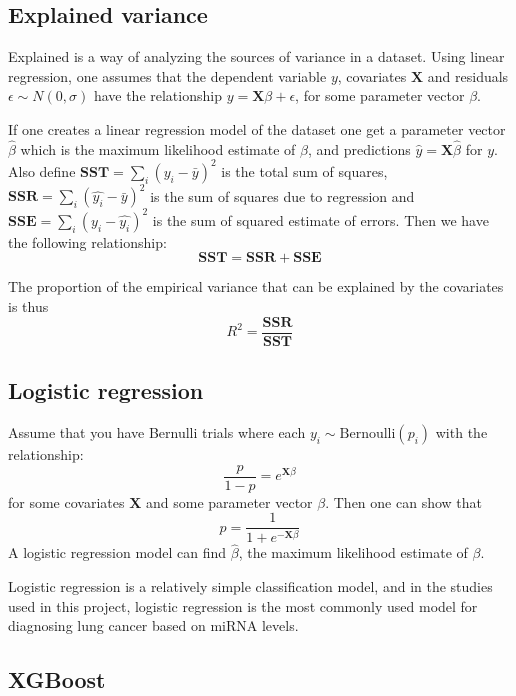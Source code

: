 \subsection{Explained variance}
\label{subsec:explained_variance}

Explained is a way of analyzing the sources of variance in a dataset. Using linear regression, one assumes that the dependent variable $y$, covariates $\mathbf{X}$ and residuals $\epsilon \sim N(0, \sigma)$ have the relationship $y = \mathbf{X}\beta + \epsilon$, for some parameter vector $\beta$.


If one creates a linear regression model of the dataset one get a parameter vector $\hat{\beta}$ which is the maximum likelihood estimate of $\beta$, and predictions $\hat{y} = \mathbf{X} \hat{\beta}$ for $y$. Also define $\mathbf{SST} = \sum_i \left(y_i - \bar{y}\right)^2$ is the total sum of squares, $\mathbf{SSR} = \sum_i \left(\hat{y_i} - \bar{y}\right)^2$ is the sum of squares due to regression and $\mathbf{SSE} = \sum_i \left(y_i - \hat{y_i}\right)^2$ is the sum of squared estimate of errors. Then we have the following relationship:
$$\mathbf{SST} = \mathbf{SSR} + \mathbf{SSE}$$

The proportion of the empirical variance that can be explained by the covariates is thus
$$R^2 = \frac{\mathbf{SSR}}{\mathbf{SST}}$$

\subsection{Logistic regression}

Assume that you have Bernulli trials where each $y_i \sim \text{Bernoulli}(p_i)$ with the relationship:
$$\frac{p}{1-p} = e^{\mathbf{X}\beta}$$
for some covariates $\mathbf{X}$ and some parameter vector $\beta$.
Then one can show that
$$p = \frac{1}{1 + e^{-\mathbf{X}\beta}}$$
A logistic regression model can find $\hat{\beta}$, the maximum likelihood estimate of $\beta$.

Logistic regression is a relatively simple classification model, and in the studies used in this project, logistic regression is the most commonly used model for diagnosing lung cancer based on miRNA levels.


\subsection{XGBoost}

